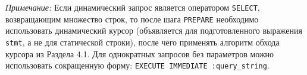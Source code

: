 \documentclass[12pt, a4paper]{article}
\begin{document}
\textit{Примечание:} Если динамический запрос является оператором \texttt{SELECT}, возвращающим множество строк, то после шага \texttt{PREPARE} необходимо использовать динамический курсор (объявляется для подготовленного выражения \texttt{stmt}, а не для статической строки), после чего применять алгоритм обхода курсора из Раздела 4.1. Для однократных запросов без параметров можно использовать сокращенную форму: \texttt{EXECUTE IMMEDIATE :query\_string}.
\end{document}
